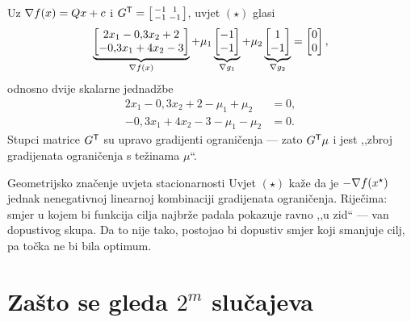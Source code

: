 \begin{korak}
Uz $\nabla f(x) = Qx + c$ i $G^{\mathsf{T}} = \begin{bsmallmatrix} -1 & 1 \\ -1 & -1\end{bsmallmatrix}$,
uvjet $(\star)$ glasi
\begin{equation}
\underbrace{\begin{bmatrix} 2x_1 - 0{,}3x_2 + 2 \\ -0{,}3x_1 + 4x_2 - 3 \end{bmatrix}}_{\nabla f(x)}
+ \mu_1 \underbrace{\begin{bmatrix} -1 \\ -1 \end{bmatrix}}_{\nabla g_1}
+ \mu_2 \underbrace{\begin{bmatrix} 1 \\ -1 \end{bmatrix}}_{\nabla g_2}
= \begin{bmatrix} 0 \\ 0 \end{bmatrix},
\label{eq:z1b-stac-raspis}
\end{equation}
odnosno dvije skalarne jednadžbe
\begin{align}
2x_1 - 0{,}3x_2 + 2 - \mu_1 + \mu_2 &= 0, \label{eq:z1b-stac1} \\
-0{,}3x_1 + 4x_2 - 3 - \mu_1 - \mu_2 &= 0. \label{eq:z1b-stac2}
\end{align}
Stupci matrice $G^{\mathsf{T}}$ su upravo gradijenti ograničenja --- zato $G^{\mathsf{T}} \mu$
i jest ,,zbroj gradijenata ograničenja s težinama $\mu$``.
\end{korak}

\begin{pojam}{Geometrijsko značenje uvjeta stacionarnosti}
Uvjet $(\star)$ kaže da je $-\nabla f(x^{\star})$ jednak nenegativnoj linearnoj
kombinaciji gradijenata ograničenja. Riječima: smjer u kojem bi funkcija cilja
najbrže padala pokazuje ravno ,,u zid`` --- van dopustivog skupa. Da to nije
tako, postojao bi dopustiv smjer koji smanjuje cilj, pa točka ne bi bila optimum.
\end{pojam}

\section{Zašto se gleda $2^m$ slučajeva}
\label{sec:z1b-slucajevi}

